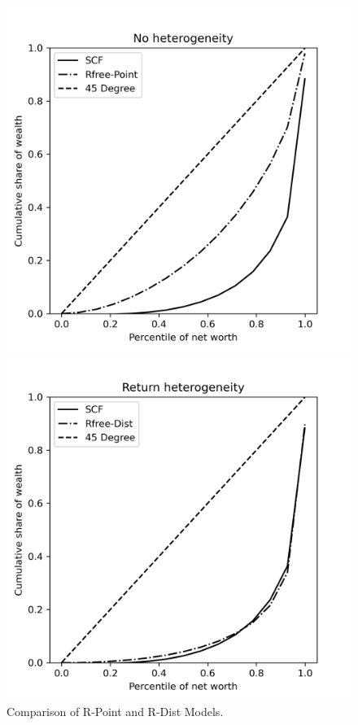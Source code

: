 \begin{figure}[h]
    \centering
    \begin{minipage}{0.48\textwidth}
        \centering
        \includegraphics[width=\textwidth]{../Figures/PYrrPointNetWorthPlot.png}
    \end{minipage}
    \hfill
    \begin{minipage}{0.48\textwidth}
        \centering
        \includegraphics[width=\textwidth]{../Figures/PYrrDistNetWorthPlot.png}
    \end{minipage}
    \caption{Comparison of R-Point and R-Dist Models.}
    \label{fig:PYUnif} 
\end{figure}

